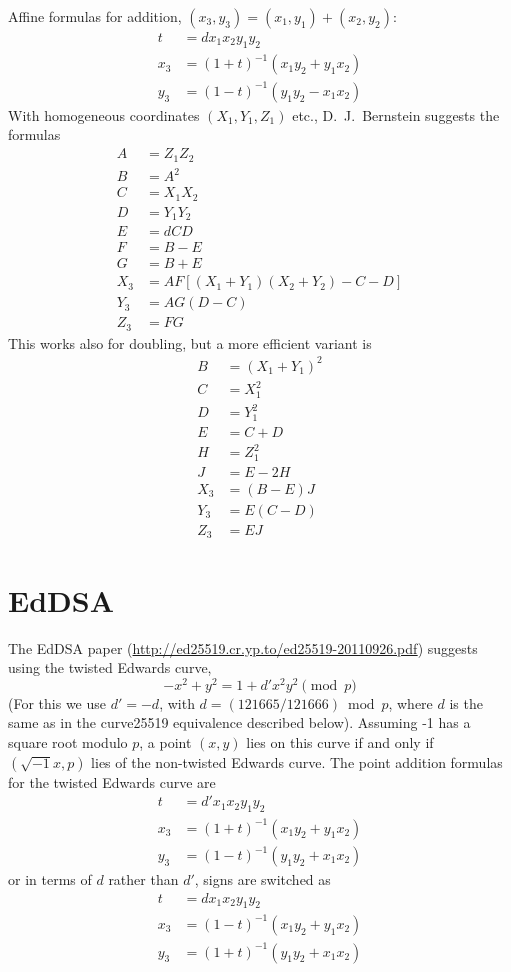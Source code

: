 \documentclass[a4paper]{article}
\begin{document}
Affine formulas for addition, $(x_3, y_3) = (x_1, y_1) + (x_2,
y_2)$:
\begin{align*}
  t &= d x_1 x_2 y_1 y_2 \\
  x_3 &= (1 + t)^{-1} (x_1 y_2 + y_1 x_2) \\
  y_3 &= (1 - t)^{-1} (y_1 y_2 - x_1 x_2)
\end{align*}
With homogeneous coordinates $(X_1, Y_1, Z_1)$ etc., D.~J.~Bernstein
suggests the formulas
\begin{align*}
  A &= Z_1 Z_2 \\
  B &= A^2 \\
  C &= X_1 X_2 \\
  D &= Y_1 Y_2 \\
  E &= d C D \\
  F &= B - E \\
  G &= B + E \\
  X_3 &= A F [(X_1 + Y_1)(X_2 + Y_2) - C - D] \\
  Y_3 &= A G (D - C) \\
  Z_3 &= F G
\end{align*}
This works also for doubling, but a more efficient variant is
\begin{align*}
  B &= (X_1 + Y_1)^2 \\
  C &= X_1^2 \\
  D &= Y_1^2 \\
  E &= C + D \\
  H &= Z_1^2 \\
  J &= E - 2H \\
  X_3 &= (B - E) J \\
  Y_3 &= E (C - D) \\
  Z_3 &= E J
\end{align*}

\section{EdDSA}

The EdDSA paper (\url{http://ed25519.cr.yp.to/ed25519-20110926.pdf})
suggests using the twisted Edwards curve,
\begin{equation*}
  -x^2 + y^2 = 1 + d' x^2 y^2 \pmod{p}
\end{equation*}
(For this we use $d' = -d$, with $d = (121665/121666) \bmod p$, where
$d$ is the same as in the curve25519 equivalence described below).
Assuming -1 has a square root modulo $p$, a point $(x, y)$ lies on
this curve if and only if $(\sqrt{-1} x, p)$ lies of the non-twisted
Edwards curve. The point addition formulas for the twisted Edwards
curve are
\begin{align*}
  t &= d' x_1 x_2 y_1 y_2 \\
  x_3 &= (1 + t)^{-1} (x_1 y_2 + y_1 x_2) \\
  y_3 &= (1 - t)^{-1} (y_1 y_2 + x_1 x_2)
\end{align*}
or in terms of $d$ rather than $d'$, signs are switched as
\begin{align*}
  t &= d x_1 x_2 y_1 y_2 \\
  x_3 &= (1 - t)^{-1} (x_1 y_2 + y_1 x_2) \\
  y_3 &= (1 + t)^{-1} (y_1 y_2 + x_1 x_2)
\end{align*}
\end{document}
